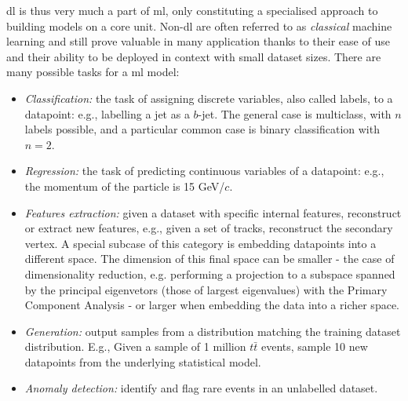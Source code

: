\gls{dl} is thus very much a part of \gls{ml}, only constituting a specialised approach to building models on a core unit. Non-\gls{dl} are often referred to as \textit{classical} machine learning and still prove valuable in many application thanks to their ease of use and their ability to be deployed in context with small dataset sizes. There are many possible tasks for a \gls{ml} model: 
\begin{itemize}
    \item \textit{Classification:} the task of assigning discrete variables, also called labels, to a datapoint: e.g., labelling a jet as a $b$-jet. The general case is multiclass, with $n$ labels possible, and a particular common case is binary classification with $n = 2$.
    \item \textit{Regression:} the task of predicting continuous variables of a datapoint: e.g., the momentum of the particle is 15 GeV/$c$. 
    \item \textit{Features extraction:} given a dataset with specific internal features, reconstruct or extract new features, e.g., given a set of tracks, reconstruct the secondary vertex. A special subcase of this category is embedding datapoints into a different space. The dimension of this final space can be smaller - the case of dimensionality reduction, e.g. performing a projection to a subspace spanned by the principal eigenvetors (those of largest eigenvalues)  with the Primary Component Analysis - or larger when embedding the data into a richer space. 
    \item \textit{Generation:} output samples from a distribution matching the training dataset distribution. E.g., Given a sample of 1 million $t\bar{t}$ events, sample 10 new datapoints from the underlying statistical model. 
    \item \textit{Anomaly detection:} identify and flag rare events in an unlabelled dataset.
\end{itemize}

